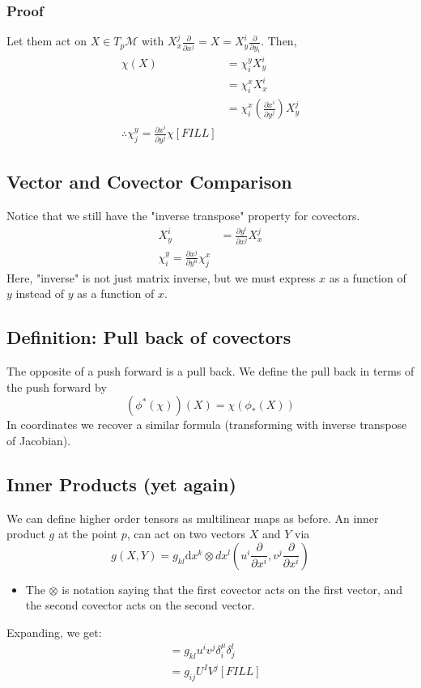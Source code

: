 \documentclass[10pt]{article}
\begin{document}
\subsubsection*{Proof}
Let them act on $X \in T_p \mathcal{M}$ with $X_x^j \frac{\partial}{\partial x^j} = X = X_y^i \frac{\partial}{\partial y_i}$.  Then,
\begin{align*}
    \chi(X) &= \chi_i^y X_y^i\\
    &= \chi_i^x X_x^i \\
    &= \chi_i^x \left(\frac{\partial x^i}{\partial y^j}\right) X_y^j\\
    \therefore \chi_j^y = \frac{\partial x^i}{\partial y^j} \chi [FILL]
\end{align*}

\subsection*{Vector and Covector Comparison}
Notice that we still have the "inverse transpose" property for covectors.
\begin{align*}
    X_y^i &= \frac{\partial y^i}{\partial x^j} X_x^j\\
    \chi_i^y = \frac{\partial x^j}{\partial y^u} \chi_j^x
\end{align*}
Here, "inverse" is not just matrix inverse, but we must express $x$ as a function of $y$ instead of $y$ as a function of $x$.

\subsection*{Definition: Pull back of covectors}
The opposite of a push forward is a pull back.  We define the pull back in terms of the push forward by
\[(\phi^*(\chi))(X) = \chi(\phi_*(X))\]
In coordinates we recover a similar formula (transforming with inverse transpose of Jacobian).

\subsection*{Inner Products (yet again)}
We can define higher order tensors as multilinear maps as before.  An inner product $g$ at the point $p$, can act on two vectors $X$ and $Y$ via
\[g(X, Y) = g_{kl} \text{d}x^k \otimes dx^l \left(u^i \frac{\partial}{\partial x^i}, v^j \frac{\partial}{\partial x^i}\right)\]
\begin{itemize}
    \item The $\otimes$ is notation saying that the first covector acts on the first vector, and the second covector acts on the second vector.
\end{itemize}
Expanding, we get:
\begin{align*}
    &= g_{kl} u^i v^j \delta_i^\mu \delta_j^l\\
    &= g_{ij} U^I V^j [FILL]
\end{align*}
\end{document}
